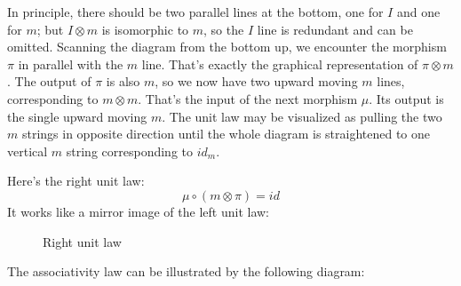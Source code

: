 \documentclass[letterpaper, 10 pt, conference]{ieeeconf}
\begin{document}
In principle, there should be two parallel lines at the bottom, one for $I$ and one for $m$; but $I \otimes m$ is isomorphic to $m$, so the $I$ line is redundant and can be omitted. Scanning the diagram from the bottom up, we encounter the morphism $\pi$ in parallel with the $m$ line. That's exactly the graphical representation of $\pi \otimes m$. The output of $\pi$ is also $m$, so we now have two upward moving $m$ lines, corresponding to $m \otimes m$. That's the input of the next morphism $\mu$. Its output is the single upward moving $m$. The unit law may be visualized as pulling the two $m$ strings in opposite direction until the whole diagram is straightened to one vertical $m$ string corresponding to $id_m$. 


Here's the right unit law:
\[\mu \circ (m \otimes \pi) = id \]
It works like a mirror image of the left unit law:

\begin{figure}[H]
\centering
{}
\caption{Right unit law}
\label{fig-runit}
\end{figure}

The associativity law can be illustrated by the following diagram:
\end{document}
